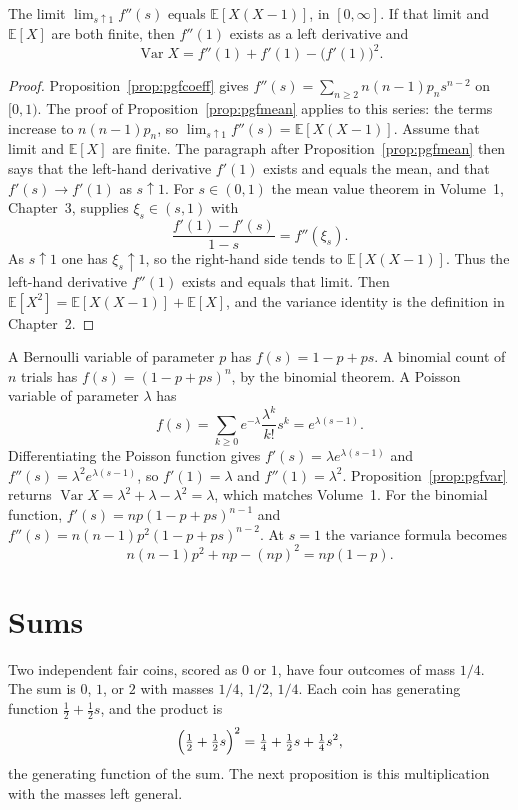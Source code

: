 \begin{proposition}\label{prop:pgfvar}
The limit $\lim_{s\uparrow1}f''(s)$ equals $\mathbb E[X(X-1)]$, in $[0,\infty]$. If that limit and $\mathbb E[X]$ are both finite, then $f''(1)$ exists as a left derivative and
\[
 \operatorname{Var}X=f''(1)+f'(1)-\bigl(f'(1)\bigr)^2.
\]
\end{proposition}
\begin{proof}
Proposition~\ref{prop:pgfcoeff} gives $f''(s)=\sum_{n\ge2}n(n-1)p_n s^{n-2}$ on $[0,1)$. The proof of Proposition~\ref{prop:pgfmean} applies to this series: the terms increase to $n(n-1)p_n$, so $\lim_{s\uparrow1}f''(s)=\mathbb E[X(X-1)]$. Assume that limit and $\mathbb E[X]$ are finite. The paragraph after Proposition~\ref{prop:pgfmean} then says that the left-hand derivative $f'(1)$ exists and equals the mean, and that $f'(s)\to f'(1)$ as $s\uparrow1$. For $s\in(0,1)$ the mean value theorem in Volume~1, Chapter~3, supplies $\xi_s\in(s,1)$ with
\[
 \frac{f'(1)-f'(s)}{1-s}=f''(\xi_s).
\]
As $s\uparrow1$ one has $\xi_s\uparrow1$, so the right-hand side tends to $\mathbb E[X(X-1)]$. Thus the left-hand derivative $f''(1)$ exists and equals that limit. Then $\mathbb E[X^2]=\mathbb E[X(X-1)]+\mathbb E[X]$, and the variance identity is the definition in Chapter~2.
\end{proof}

\begin{example}\label{ex:pgfexamples}
A Bernoulli variable of parameter $p$ has $f(s)=1-p+ps$. A binomial count of $n$ trials has $f(s)=(1-p+ps)^n$, by the binomial theorem. A Poisson variable of parameter $\lambda$ has
\[
 f(s)=\sum_{k\ge0}e^{-\lambda}\frac{\lambda^k}{k!}s^k=e^{\lambda(s-1)}.
\]
Differentiating the Poisson function gives $f'(s)=\lambda e^{\lambda(s-1)}$ and $f''(s)=\lambda^2 e^{\lambda(s-1)}$, so $f'(1)=\lambda$ and $f''(1)=\lambda^2$. Proposition~\ref{prop:pgfvar} returns $\operatorname{Var}X=\lambda^2+\lambda-\lambda^2=\lambda$, which matches Volume~1. For the binomial function, $f'(s)=np(1-p+ps)^{n-1}$ and $f''(s)=n(n-1)p^2(1-p+ps)^{n-2}$. At $s=1$ the variance formula becomes
\[
 n(n-1)p^2+np-(np)^2=np(1-p).
\]
\end{example}

\section{Sums}

Two independent fair coins, scored as $0$ or $1$, have four outcomes of mass $1/4$. The sum is $0$, $1$, or $2$ with masses $1/4$, $1/2$, $1/4$. Each coin has generating function $\tfrac12+\tfrac12 s$, and the product is
\[
 \Bigl(\tfrac12+\tfrac12 s\Bigr)^2=\tfrac14+\tfrac12 s+\tfrac14 s^2,
\]
the generating function of the sum. The next proposition is this multiplication with the masses left general.

